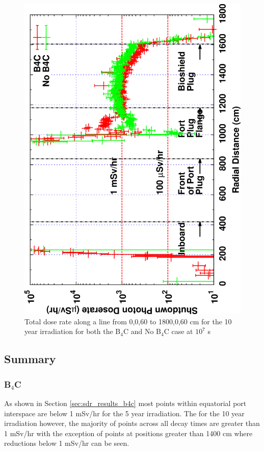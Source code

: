 \documentclass[12pt]{article}
\begin{document}
\begin{figure}[ht!]
\centering
\includegraphics[clip,scale=0.12,angle=-90]{../plots/photon_lineout/comp/10yr_dc3.png}
\caption{Total dose rate along a line from 0,0,60 to 1800,0,60 cm for the 10 year irradiation
for both the B$_4$C and No B$_4$C case at $10^7$ s}
\label{fig:photons_10y_dc3_dose}
\end{figure}
\clearpage
\newpage
\subsection{Summary}
\subsubsection*{B$_4$C}
As shown in Section \ref{sec:sdr_results_b4c} most points within equatorial port
interspace are below 1 mSv/hr for the 5 year irradiation. The for the 10 year
irradiation however, the majority of points across all decay times are
greater than 1 mSv/hr with the exception of points at positions greater than
1400 cm where reductions below 1 mSv/hr can be seen.
\end{document}
